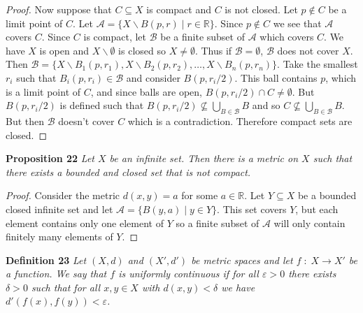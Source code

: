 \documentclass{article}
\begin{document}
\begin{flushleft}
\begin{proof}
Now suppose that $C \subseteq X$ is compact and $C$ is not closed. Let $p \notin C$ be a limit point of $C$. Let $\mathcal{A} = \{X \backslash B(p,r) \mid r \in \mathbb{R}\}$. Since $p \notin C$ we see that $\mathcal{A}$ covers $C$. Since $C$ is compact, let $\mathcal{B}$ be a finite subset of $\mathcal{A}$ which covers $C$. We have $X$ is open and $X \backslash \emptyset$ is closed so $X \neq \emptyset$. Thus if $\mathcal{B} = \emptyset$, $\mathcal{B}$ does not cover $X$. Then $\mathcal{B} = \{X \backslash B_1(p,r_1), X \backslash B_2(p,r_2), \dots , X \backslash B_n(p,r_n)\}$. Take the smallest $r_i$ such that $B_i(p,r_i) \in \mathcal{B}$ and consider $B(p,r_i/2)$. This ball contains $p$, which is a limit point of $C$, and since balls are open, $B(p,r_i/2) \cap C \neq \emptyset$. But $B(p,r_i/2)$ is defined such that $B(p,r_i/2) \nsubseteq \bigcup_{B \in \mathcal{B}} B$ and so $C \nsubseteq \bigcup_{B \in \mathcal{B}} B$. But then $\mathcal{B}$ doesn't cover $C$ which is a contradiction. Therefore compact sets are closed.
\end{proof}

\textbf{Proposition 22}
\textsl{Let $X$ be an infinite set. Then there is a metric on $X$ such that there exists a bounded and closed set that is not compact.}
\begin{proof}
Consider the metric $d(x,y) = a$ for some $a \in \mathbb{R}$. Let $Y \subseteq X$ be a bounded closed infinite set and let $\mathcal{A} = \{B(y, a) \mid y \in Y\}$. This set covers $Y$, but each element contains only one element of $Y$ so a finite subset of $\mathcal{A}$ will only contain finitely many elements of $Y$.
\end{proof}

\textbf{Definition 23}
\textsl{Let $(X,d)$ and $(X',d')$ be metric spaces and let $f \; : \; X \rightarrow X'$ be a function. We say that $f$ is uniformly continuous if for all $\varepsilon > 0$ there exists $\delta > 0$ such that for all $x, y \in X$ with $d(x,y) < \delta$ we have $d'(f(x),f(y)) < \varepsilon$.}\newline


\end{flushleft}
\end{document}
